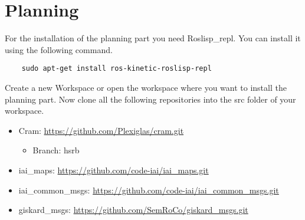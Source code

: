 \documentclass[main.tex]{subfiles}
\begin{document}
	\section{Planning}
	
	For the installation of the planning part you need Roslisp\_repl.
	You can install it using the following command.
	\begin{lstlisting}
	sudo apt-get install ros-kinetic-roslisp-repl \end{lstlisting}

	Create a new Workspace or open the workspace where you want to install the planning part. Now clone all the following repositories into the src folder of your workspace.
	\begin{itemize}
	\item Cram: \url{https://github.com/Plexiglas/cram.git}
		\begin{itemize}
		\item Branch: hsrb
		\end{itemize}
	\item iai_maps: \url{https://github.com/code-iai/iai_maps.git}
	\item iai_common_msgs: \url{https://github.com/code-iai/iai_common_msgs.git}
	\item giskard_msgs: \url{https://github.com/SemRoCo/giskard_msgs.git}
	
	\end{itemize}
\end{document}

